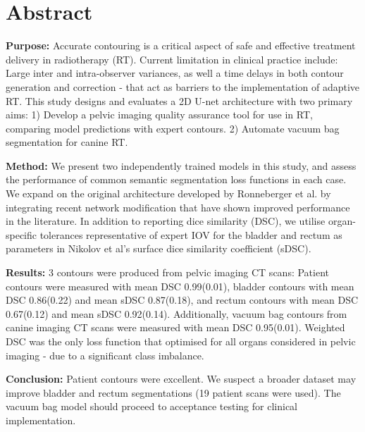 \chapter{Abstract}
\label{ch:abstract}

\textbf{Purpose:} Accurate contouring is a critical aspect of safe and effective treatment delivery in radiotherapy (RT). Current limitation in clinical practice include: Large inter and intra-observer variances, as well a time delays in both contour generation and correction - that act as barriers to the implementation of adaptive RT. This study designs and evaluates a 2D U-net architecture with two primary aims: 1) Develop a pelvic imaging quality assurance tool for use in RT, comparing model predictions with expert contours. 2) Automate vacuum bag segmentation for canine RT.

\textbf{Method:}
 We present two independently trained models in this study, and assess the performance of common semantic segmentation loss functions in each case. We expand on the original architecture developed by Ronneberger et al. by integrating recent network modification that have shown improved performance in the literature. In addition to reporting dice similarity (DSC), we utilise organ-specific tolerances representative of expert IOV for the bladder and rectum as parameters in Nikolov et al's surface dice similarity coefficient (sDSC).

\textbf{Results:}
3 contours were produced from pelvic imaging CT scans: Patient contours were measured with mean DSC 0.99(0.01), bladder contours with mean DSC 0.86(0.22) and mean sDSC 0.87(0.18), and rectum contours with mean DSC 0.67(0.12) and mean sDSC 0.92(0.14). Additionally, vacuum bag contours from canine imaging CT scans were measured with mean DSC 0.95(0.01). Weighted DSC was the only loss function that optimised for all organs considered in pelvic imaging - due to a significant class imbalance.

\textbf{Conclusion:}
Patient contours were excellent. We suspect a broader dataset may improve bladder and rectum segmentations (19 patient scans were used). The vacuum bag model should proceed to acceptance testing for clinical implementation.